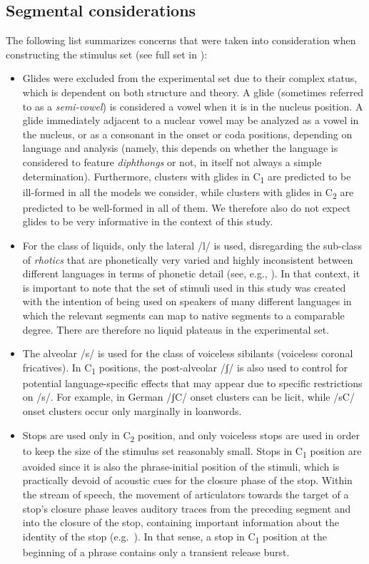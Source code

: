 \subsection{Segmental considerations}\label{sec:stimChoice}

The following list summarizes concerns that were taken into consideration when constructing the stimulus set (see full set in ):

\begin{itemize}
\item
  Glides were excluded from the experimental set due to their complex status, which is dependent on both structure and theory. A glide (sometimes referred to as a \emph{semi-vowel}) is considered a vowel when it is in the nucleus position. A glide immediately adjacent to a nuclear vowel may be analyzed as a vowel in the nucleus, or as a consonant in the onset or coda positions, depending on language and analysis (namely, this depends on whether the language is considered to feature \emph{diphthongs} or not, in itself not always a simple determination). Furthermore, clusters with glides in C\textsubscript{1} are predicted to be ill-formed in all the models we consider, while clusters with glides in C\textsubscript{2} are predicted to be well-formed in all of them. We therefore also do not expect glides to be very informative in the context of this study.
\item
  For the class of liquids, only the lateral /l/ is used, disregarding the sub-class of \emph{rhotics} that are phonetically very varied and highly inconsistent between different languages in terms of phonetic detail (see, e.g., \citealt{lindau1980storysk, ladefoged1996rhotics, wiese2001phonology}). In that context, it is important to note that the set of stimuli used in this study was created with the intention of being used on speakers of many different languages in which the relevant segments can map to native segments to a comparable degree. There are therefore no liquid plateaus in the experimental set.
\item
  The alveolar /s/ is used for the class of voiceless sibilants (voiceless coronal fricatives). In C\textsubscript{1} positions, the post-alveolar /ʃ/ is also used to control for potential language-specific effects that may appear due to specific restrictions on /s/. For example, in German /ʃC/ onset clusters can be licit, while /sC/ onset clusters occur only marginally in loanwords.
\item
  Stops are used only in C\textsubscript{2} position, and only voiceless stops are used in order to keep the size of the stimulus set reasonably small. Stops in C\textsubscript{1} position are avoided since it is also the phrase-initial position of the stimuli, which is practically devoid of acoustic cues for the closure phase of the stop. Within the stream of speech, the movement of articulators towards the target of a stop's closure phase leaves auditory traces from the preceding segment and into the closure of the stop, containing important information about the identity of the stop (e.g.~\citealt{barry1984place}). In that sense, a stop in C\textsubscript{1} position at the beginning of a phrase contains only a transient release burst.

\end{itemize}
